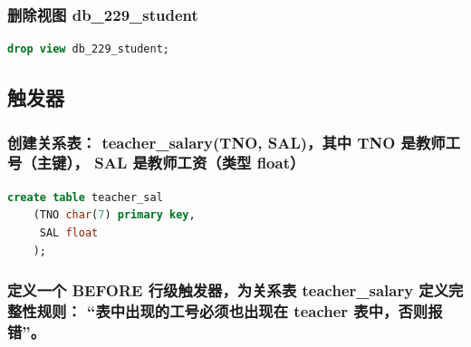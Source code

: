 \documentclass{ctexart}
\begin{document}
\subsubsection{删除视图 db\_229\_student}
\begin{lstlisting}[language=sql]
	drop view db_229_student;
\end{lstlisting}
\subsection{触发器}
\subsubsection{创建关系表： teacher\_salary(TNO, SAL)，其中 TNO 是教师工号（主键）， SAL 是教师工资（类型 float）}
\begin{lstlisting}[language=sql]
	create table teacher_sal
	(TNO char(7) primary key,  
	 SAL float
	);
\end{lstlisting}
\subsubsection{定义一个 BEFORE 行级触发器，为关系表 teacher\_salary 定义完整性规则： “表中出现的工号必须也出现在 teacher 表中，否则报错”。}
\end{document}
